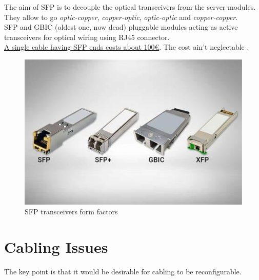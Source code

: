 \begin{paracol}{2}
   
   The aim of SFP is to decouple the optical transceivers from the server modules.
   They allow to go \textit{optic-copper}, \textit{copper-optic}, \textit{optic-optic} and \textit{copper-copper}.\\
   SFP and GBIC (oldest one, now dead) pluggable modules acting as active transceivers for optical wiring using RJ45 connector.\\
   \ul{A single cable having SFP ends costs about 100€}.
   The cost ain't neglectable \smiley.


   \switchcolumn

   \begin{figure}[htbp]
      \centering
      \includegraphics{images/sfp.jpeg}
      \caption{SFP transceivers form factors}
      \label{fig:sfp}
   \end{figure}
\end{paracol}


\section{Cabling Issues}
The key point is that it would be desirable for cabling to be reconfigurable.

